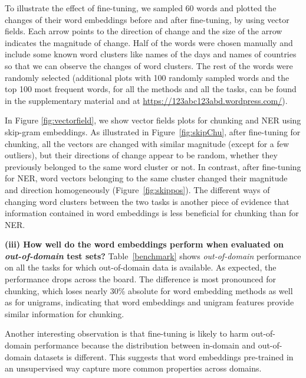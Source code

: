 To illustrate the effect of fine-tuning, we sampled 60 words and plotted the changes of their word embeddings before and after fine-tuning, by using vector fields. Each arrow points to the direction of change and the size of the arrow indicates the magnitude of change.  Half of the words were chosen manually and include some known word clusters like names of the days and names of countries so that we can observe the changes of word clusters.  The rest of the words were randomly selected (additional plots with 100 randomly sampled words and the top 100 most frequent words, for all the methods and all the tasks, can be found in the supplementary material and at \url{https://123abc123abd.wordpress.com/}).

In Figure \ref{fig:vectorfield}, we show vector fields plots for chunking and NER using skip-gram embeddings.
As illustrated in Figure~\ref{fig:skipChu}, after fine-tuning for chunking, all the vectors are changed with similar magnitude 
(except for a few outliers), but their directions of change appear to be random, 
whether they previously belonged to the same word cluster or not. 
In contrast, after fine-tuning for NER, word vectors belonging to the same cluster changed their magnitude and direction homogeneously (Figure~\ref{fig:skippos}). 
The different ways of changing word clusters between the two tasks is another piece of evidence that information contained in word embeddings is less beneficial for chunking than for NER. 

\textbf{(iii) How well do the word embeddings perform when evaluated on \textit{out-of-domain} test sets?}
Table~\ref{benchmark} shows \textit{out-of-domain} performance on all the tasks for which out-of-domain data is available.
As expected, the performance drops across the board. The difference is most pronounced for chunking, which loses nearly 30\% absolute for word embedding methods as well as for unigrams, 
indicating that word embeddings and unigram features provide similar information 
for chunking. 

Another interesting observation is that fine-tuning is likely to harm out-of-domain performance because the distribution between in-domain and out-of-domain datasets is different. This suggests that word embeddings pre-trained in an unsupervised way capture more common properties across domains. 

